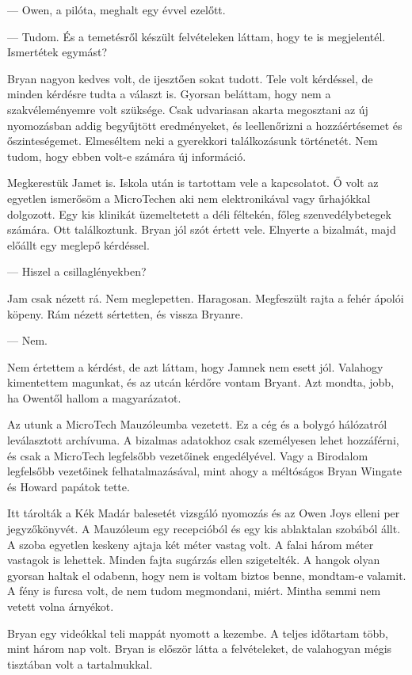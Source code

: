 \documentclass[10pt]{memoir}
\begin{document}
— Owen, a pilóta, meghalt egy évvel ezelőtt.

— Tudom. És a temetésről készült felvételeken láttam, hogy te is megjelentél.
Ismertétek egymást?

Bryan nagyon kedves volt, de ijesztően sokat tudott. Tele volt kérdéssel, de
minden kérdésre tudta a választ is. Gyorsan beláttam, hogy nem a
szakvéleményemre volt szüksége. Csak udvariasan akarta megosztani az új
nyomozásban addig begyűjtött eredményeket, és leellenőrizni a hozzáértésemet és
őszinteségemet. Elmeséltem neki a gyerekkori találkozásunk történetét. Nem
tudom, hogy ebben volt-e számára új információ.

Megkerestük Jamet is. Iskola után is tartottam vele a kapcsolatot. Ő volt az
egyetlen ismerősöm a MicroTechen aki nem elektronikával vagy űrhajókkal
dolgozott. Egy kis klinikát üzemeltetett a déli féltekén, főleg
szenvedélybetegek számára. Ott találkoztunk. Bryan jól szót értett vele.
Elnyerte a bizalmát, majd előállt egy meglepő kérdéssel.

— Hiszel a csillaglényekben?

Jam csak nézett rá. Nem meglepetten. Haragosan. Megfeszült rajta a fehér ápolói
köpeny. Rám nézett sértetten, és vissza Bryanre.

— Nem.

Nem értettem a kérdést, de azt láttam, hogy Jamnek nem esett jól. Valahogy
kimentettem magunkat, és az utcán kérdőre vontam Bryant. Azt mondta, jobb, ha
Owentől hallom a magyarázatot.

Az utunk a MicroTech Mauzóleumba vezetett. Ez a cég és a bolygó hálózatról
leválasztott archívuma. A bizalmas adatokhoz csak személyesen lehet hozzáférni,
és csak a MicroTech legfelsőbb vezetőinek engedélyével. Vagy a Birodalom
legfelsőbb vezetőinek felhatalmazásával, mint ahogy a méltóságos Bryan Wingate
és Howard papátok tette.

Itt tárolták a Kék Madár balesetét vizsgáló nyomozás és az Owen Joys elleni per
jegyzőkönyvét. A Mauzóleum egy recepcióból és egy kis ablaktalan szobából állt.
A szoba egyetlen keskeny ajtaja két méter vastag volt. A falai három méter
vastagok is lehettek. Minden fajta sugárzás ellen szigetelték. A hangok olyan
gyorsan haltak el odabenn, hogy nem is voltam biztos benne, mondtam-e valamit.
A fény is furcsa volt, de nem tudom megmondani, miért. Mintha semmi nem vetett
volna árnyékot.

Bryan egy videókkal teli mappát nyomott a kezembe. A teljes időtartam több,
mint három nap volt. Bryan is először látta a felvételeket, de valahogyan mégis
tisztában volt a tartalmukkal.
\end{document}
